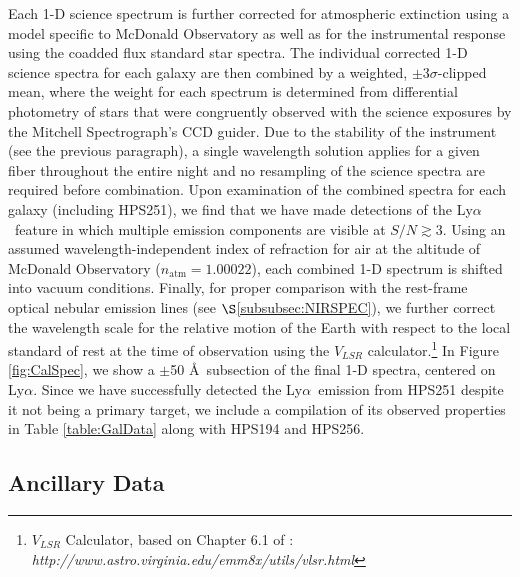 \documentclass{emulateapj}
\newcommand{\lya}{Ly$\alpha$}
\begin{document}
Each 1-D science spectrum is further corrected for atmospheric extinction using a model specific to McDonald Observatory as well as for the instrumental response using the coadded flux standard star spectra. The individual corrected 1-D science spectra for each galaxy are then combined by a weighted, $\pm$3$\sigma$-clipped mean, where the weight for each spectrum is determined from differential photometry of stars that were congruently observed with the science exposures by the Mitchell Spectrograph's CCD guider. Due to the stability of the instrument (see the previous paragraph), a single wavelength solution applies for a given fiber throughout the entire night and no resampling of the science spectra are required before combination. Upon examination of the combined spectra for each galaxy (including HPS251), we find that we have made detections of the \lya\ feature in which multiple emission components are visible at $S/N \gtrsim 3$. Using an assumed wavelength-independent index of refraction for air at the altitude of McDonald Observatory ($n_{\mathrm{atm}} = 1.00022$), each combined 1-D spectrum is shifted into vacuum conditions. Finally, for proper comparison with the rest-frame optical nebular emission lines (see $\S$\ref{subsubsec:NIRSPEC}), we further correct the wavelength scale for the relative motion of the Earth with respect to the local standard of rest at the time of observation using the $V_{LSR}$ calculator.\footnote[8]{$V_{LSR}$ Calculator, based on Chapter 6.1 of \citet{meeks1976}: \textit{http://www.astro.virginia.edu/emm8x/utils/vlsr.html}} In Figure \ref{fig:CalSpec}, we show a $\pm$50 \AA\ subsection of the final 1-D spectra, centered on \lya. Since we have successfully detected the \lya\ emission from HPS251 despite it not being a primary target, we include a compilation of its observed properties in Table \ref{table:GalData} along with HPS194 and HPS256. 

\subsection{Ancillary Data}\label{subsec:Ancillary}
\end{document}
